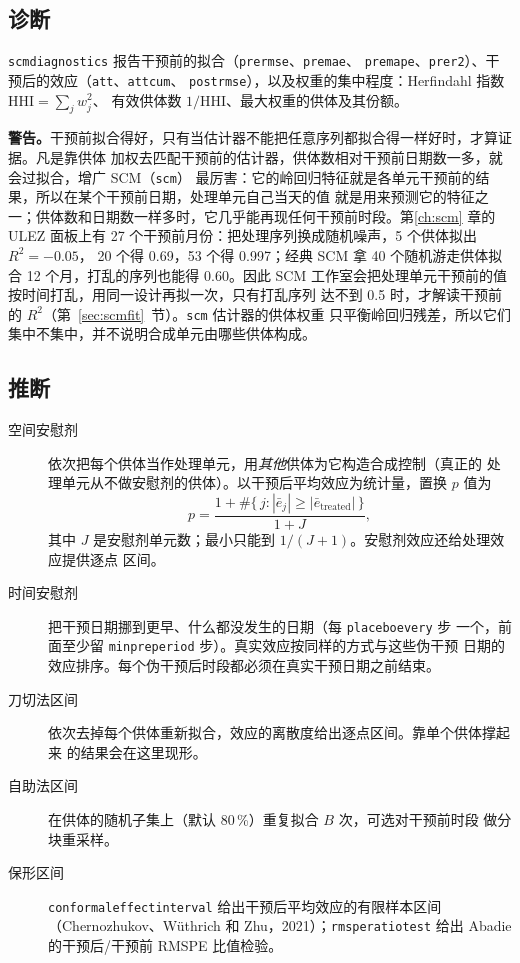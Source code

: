 \documentclass[11pt]{ctexrep}
\newcommand{\codeunderscore}{\textunderscore\allowbreak}
\newcommand{\code}[1]{\texttt{\let\_\codeunderscore #1}}
\newcommand{\caution}[1]{\par\noindent\colorbox{warn!15}{\parbox{0.97\linewidth}{\small\textbf{警告。}#1}}\par}
\begin{document}
\subsection{诊断}\label{sec:scmdiag}
\code{scm\_diagnostics} 报告干预前的拟合（\code{pre\_rmse}、\code{pre\_mae}、
\code{pre\_mape}、\code{pre\_r2}）、干预后的效应（\code{att}、\code{att\_cum}、
\code{post\_rmse}），以及权重的集中程度：Herfindahl 指数 $\text{HHI} = \sum_j w_j^2$、
有效供体数 $1/\text{HHI}$、最大权重的供体及其份额。

\caution{干预前拟合得好，只有当估计器不能把任意序列都拟合得一样好时，才算证据。凡是靠供体
加权去匹配干预前的估计器，供体数相对干预前日期数一多，就会过拟合，增广 SCM（\code{scm}）
最厉害：它的岭回归特征就是各单元干预前的结果，所以在某个干预前日期，处理单元自己当天的值
就是用来预测它的特征之一；供体数和日期数一样多时，它几乎能再现任何干预前时段。第\ref{ch:scm}
章的 ULEZ 面板上有 27 个干预前月份：把处理序列换成随机噪声，5 个供体拟出 $R^2 = -0.05$，
20 个得 0.69，53 个得 0.997；经典 SCM 拿 40 个随机游走供体拟合 12 个月，打乱的序列也能得
0.60。因此 SCM 工作室会把处理单元干预前的值按时间打乱，用同一设计再拟一次，只有打乱序列
达不到 0.5 时，才解读干预前的 $R^2$（第~\ref{sec:scmfit}~节）。\code{scm} 估计器的供体权重
只平衡岭回归残差，所以它们集中不集中，并不说明合成单元由哪些供体构成。}

\subsection{推断}\label{sec:scminference}
\begin{description}
  \item[空间安慰剂] 依次把每个供体当作处理单元，用\emph{其他}供体为它构造合成控制（真正的
        处理单元从不做安慰剂的供体）。以干预后平均效应为统计量，置换 $p$ 值为
        \begin{equation}
          p = \frac{1 + \#\{\,j : |\bar{e}_j| \ge |\bar{e}_\text{treated}|\,\}}{1 + J},
        \end{equation}
        其中 $J$ 是安慰剂单元数；最小只能到 $1/(J+1)$。安慰剂效应还给处理效应提供逐点
        区间。
  \item[时间安慰剂] 把干预日期挪到更早、什么都没发生的日期（每 \code{placebo\_every} 步
        一个，前面至少留 \code{min\_pre\_period} 步）。真实效应按同样的方式与这些伪干预
        日期的效应排序。每个伪干预后时段都必须在真实干预日期之前结束。
  \item[刀切法区间] 依次去掉每个供体重新拟合，效应的离散度给出逐点区间。靠单个供体撑起来
        的结果会在这里现形。
  \item[自助法区间] 在供体的随机子集上（默认 80\,\%）重复拟合 $B$ 次，可选对干预前时段
        做分块重采样。
  \item[保形区间] \code{conformal\_effect\_interval} 给出干预后平均效应的有限样本区间
        （Chernozhukov、W\"uthrich 和 Zhu，2021）；\code{rmspe\_ratio\_test} 给出 Abadie
        的干预后/干预前 RMSPE 比值检验。
\end{description}
\end{document}
